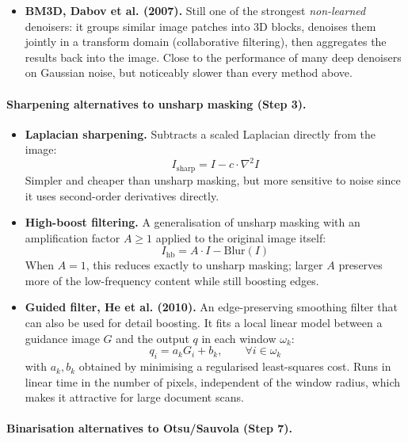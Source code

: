 \documentclass[12pt, a4paper]{article}
\begin{document}
\begin{itemize}
  \item \textbf{BM3D, Dabov et al. (2007).} Still one of the strongest \emph{non-learned} denoisers: it groups similar image patches into 3D blocks, denoises them jointly in a transform domain (collaborative filtering), then aggregates the results back into the image. Close to the performance of many deep denoisers on Gaussian noise, but noticeably slower than every method above.
\end{itemize}

\paragraph{Sharpening alternatives to unsharp masking (Step 3).}

\begin{itemize}
  \item \textbf{Laplacian sharpening.} Subtracts a scaled Laplacian directly from the image:
  \[
  I_{\text{sharp}} = I - c \cdot \nabla^2 I
  \]
  Simpler and cheaper than unsharp masking, but more sensitive to noise since it uses second-order derivatives directly.

  \item \textbf{High-boost filtering.} A generalisation of unsharp masking with an amplification factor $A \ge 1$ applied to the original image itself:
  \[
  I_{\text{hb}} = A \cdot I - \text{Blur}(I)
  \]
  When $A=1$, this reduces exactly to unsharp masking; larger $A$ preserves more of the low-frequency content while still boosting edges.

  \item \textbf{Guided filter, He et al. (2010).} An edge-preserving smoothing filter that can also be used for detail boosting. It fits a local linear model between a guidance image $G$ and the output $q$ in each window $\omega_k$:
  \[
  q_i = a_k G_i + b_k, \qquad \forall i \in \omega_k
  \]
  with $a_k, b_k$ obtained by minimising a regularised least-squares cost. Runs in linear time in the number of pixels, independent of the window radius, which makes it attractive for large document scans.
\end{itemize}

\paragraph{Binarisation alternatives to Otsu/Sauvola (Step 7).}
\end{document}
